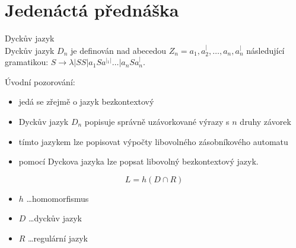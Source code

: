 \documentclass[../main.tex]{subfiles}
\begin{document}
\section{Jedenáctá přednáška}
\begin{definition}
    Dyckův jazyk\\

    Dyckův jazyk $D_n$ je definován nad abecedou $Z_n = {a_1,a^|_2,\dots,a_n,a^|_n}$ následující gramatikou:
    $S \rightarrow \lambda|SS|a_1Sa^|_1|\dots|a_nSa^|_n.$

    Úvodní pozorování:
    \begin{itemize}
        \item jedá se zřejmě o jazyk bezkontextový
        \item Dyckův jazyk $D_n$ popisuje správně uzávorkované výrazy s $n$ druhy závorek
        \item tímto jazykem lze popisovat výpočty libovolného zásobníkového automatu
        \item pomocí Dyckova jazyka lze popsat libovolný bezkontextový jazyk. 
    \end{itemize}
    \[L = h(D\cap R)\]
    \begin{itemize}
        \item $h$ \dots homomorfismus
        \item $D$ \dots dyckův jazyk
        \item $R$ \dots regulární jazyk
    \end{itemize}
\end{definition}
\end{document}
